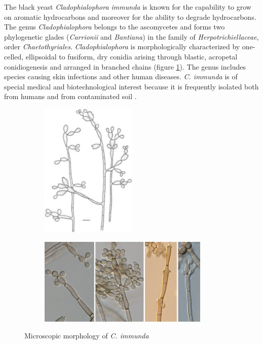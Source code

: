 \documentclass[12pt, a4paper]{report}
\begin{document}
The black yeast \textit{Cladophialophora immunda} is known for the capability to grow on aromatic hydrocarbons and moreover for the ability to degrade hydrocarbons.\\
The genus \textit{Cladophialophora} belongs to the ascomycetes and forms two phylogenetic glades (\textit{Carrionii} and \textit{Bantiana}) in the family of \textit{Herpotrichiellaceae}, order \textit{Chaetothyriales}. \textit{Cladophialophora} is morphologically characterized by one-celled, ellipsoidal to fusiform, dry conidia arising through blastic, acropetal conidiogenesis and arranged in branched chains (figure \ref{fig:morph}). The genus includes species causing skin infections and other human diseases. \textit{C. immunda} is of special medical and biotechnological interest because it is frequently isolated both from humans and from contaminated soil \cite{Sterflinger2015, Badali2008}. 

\begin{figure}[H]
	\centering
	\begin{subfigure}{0.4\textwidth}
		\includegraphics[width=130pt]{pics/cimmunda_morph} 
	\end{subfigure}
	\hspace*{0.01cm} 
	\begin{subfigure}{0.5\textwidth}
		\includegraphics[width=230pt]{pics/cimmunda_morph2} 
	\end{subfigure}
	\hspace*{\fill} %
	\caption{Microscopic morphology of \textit{C. immunda} \cite{Badali2008}} \label{fig:morph}
\end{figure}
\end{document}
